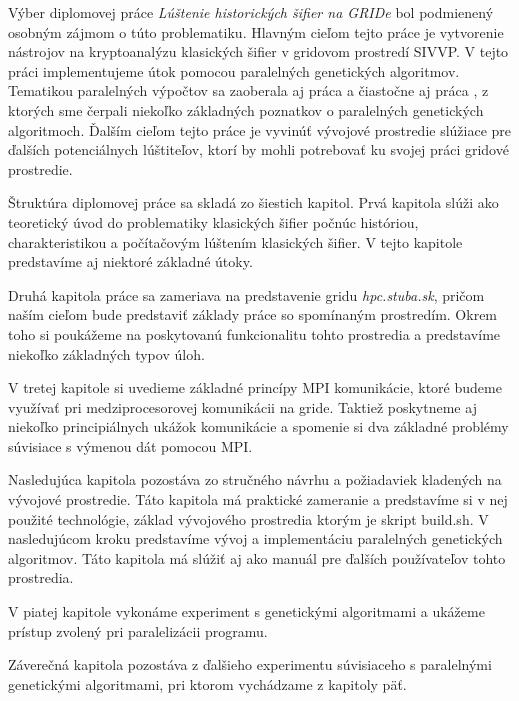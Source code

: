 
Výber diplomovej práce \textit{Lúštenie historických šifier na GRIDe} bol podmienený osobným zájmom o túto problematiku.
Hlavným cieľom tejto práce je vytvorenie nástrojov na kryptoanalýzu klasických šifier v gridovom prostredí SIVVP.
V tejto práci implementujeme útok pomocou paralelných genetických algoritmov.
Tematikou paralelných výpočtov sa zaoberala aj práca \cite{pea} a čiastočne aj práca \cite{ev}, z ktorých sme čerpali niekoľko základných poznatkov o paralelných genetických algoritmoch.
Ďalším cieľom tejto práce je vyvinúť vývojové prostredie slúžiace pre ďalších potenciálnych lúštiteľov, ktorí by mohli potrebovať ku svojej práci gridové prostredie.

Štruktúra diplomovej práce sa skladá zo šiestich kapitol.
Prvá kapitola slúži ako teoretický úvod do problematiky klasických šifier počnúc históriou, charakteristikou a počítačovým lúštením klasických šifier. V tejto kapitole predstavíme aj niektoré základné útoky.

Druhá kapitola práce sa zameriava na predstavenie gridu \textit{hpc.stuba.sk}, pričom naším cieľom bude predstaviť základy práce so spomínaným prostredím.
Okrem toho si poukážeme na poskytovanú funkcionalitu tohto prostredia a predstavíme niekoľko základných typov úloh.

V tretej kapitole si uvedieme základné princípy MPI komunikácie, ktoré budeme využívať pri medziprocesorovej komunikácii na gride.
Taktiež poskytneme aj niekoľko principiálnych ukážok komunikácie a spomenie si dva základné problémy súvisiace s výmenou dát pomocou MPI.

Nasledujúca kapitola pozostáva zo stručného návrhu a požiadaviek kladených na vývojové prostredie.
Táto kapitola má praktické zameranie a predstavíme si v nej použité technológie, základ vývojového prostredia ktorým je skript build.sh.
V nasledujúcom kroku predstavíme vývoj a implementáciu paralelných genetických algoritmov. Táto kapitola má slúžiť aj ako manuál
pre ďalších používateľov tohto prostredia.

V piatej kapitole vykonáme experiment s genetickými algoritmami a ukážeme prístup zvolený pri paralelizácii programu.

Záverečná kapitola pozostáva z ďalšieho experimentu súvisiaceho s paralelnými genetickými algoritmami, pri ktorom vychádzame z kapitoly päť.


